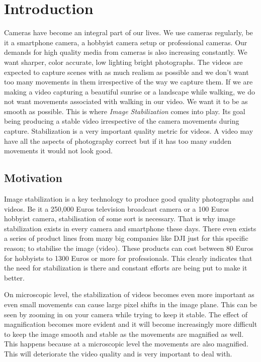 \chapter{Introduction} \label{chapter_one}

Cameras have become an integral part of our lives. We use cameras regularly, be it a smartphone camera, a hobbyist camera setup or professional cameras. Our demands for high quality media from cameras is also increasing constantly. We want sharper, color accurate, low lighting bright photographs. The videos are expected to capture scenes with as much realism as possible and we don't want too many movements in them irrespective of the way we capture them. If we are making a video capturing a beautiful sunrise or a landscape while walking, we do not want movements associated with walking in our video. We want it to be as smooth as possible. This is where \textit{Image Stabilization} comes into play. Its goal being producing a stable video irrespective of the camera movements during capture. Stabilization is a very important quality metric for videos. A video may have all the aspects of photography correct but if it has too many sudden movements it would not look good.

\section{Motivation}

Image stabilization is a key technology to produce  good quality photographs and videos. Be it a 250,000 Euros television broadcast camera or a 100 Euros hobbyist camera, stabilisation of some sort is necessary. That is why image stabilization exists in every camera and smartphone these days. There even exists a series of product lines from many big companies like DJI just for this specific reason; to stabilise the image (video). These products can cost between 80 Euros for hobbyists to 1300 Euros or more for professionals. This clearly indicates that the need for stabilization is there and constant efforts are being put to make it better.

On microscopic level, the stabilization of videos becomes even more important as even small movements can cause large pixel shifts in the image plane. This can be seen by zooming in on your camera while trying to keep it stable. The effect of magnification becomes more evident and it will become increasingly more difficult to keep the image smooth and stable as the movements are magnified as well. This happens because at a microscopic level the movements are also magnified. This will deteriorate the video quality and is very important to deal with. 

